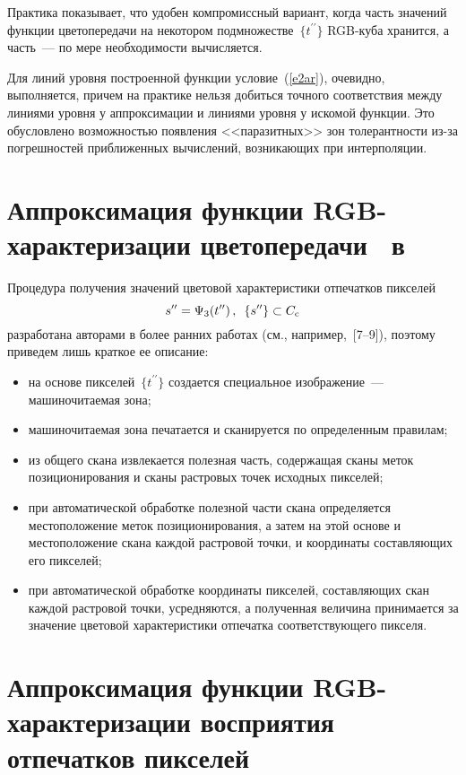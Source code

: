 \begin{multicols}{2}
  Практика показывает, что удобен компро\-мис\-сный вариант, когда часть 
значений функции цветопередачи на некотором 
подмножестве~$\{t^{\prime\prime}\}$ RGB-ку\-ба хранится, а часть~--- по 
мере необходимости вычисляется. 
  
  Для линий уровня построенной функции условие~(\ref{e2ar}), очевидно, 
выполняется, причем на практике нельзя добиться точного соответствия между 
линиями уровня у аппроксимации и линиями уровня у искомой функции. Это 
обусловлено возможностью появления <<паразитных>> зон толерантности 
  из-за погрешностей приближенных вычислений, возникающих при 
интерполяции. 

\section{Аппроксимация функции RGB-характеризации 
цветопередачи~
 в~ 
}

  Процедура получения значений цветовой характеристики отпечатков 
пикселей
  $$
s^{\prime\prime} = \Psi_3(t^{\prime\prime})\,,\enskip \{s^{\prime\prime}\} \subset 
C_{\mathrm{c}}
$$
разработана авторами в более ранних работах (см., например,~[7--9]), поэтому 
приведем лишь краткое ее описание:
\begin{itemize}
  \item на основе пикселей~$\{t^{\prime\prime}\}$ создается специальное 
изображение~--- машиночитаемая зона;
  \item машиночитаемая зона печатается и сканируется по определенным 
правилам;
  \item из общего скана извлекается полезная часть, содержащая сканы меток 
позиционирования и сканы растровых точек исходных пикселей;
  \item при автоматической обработке полезной части скана определяется 
местоположение меток позиционирования, а затем на этой основе и 
мес\-то\-по\-ло\-же\-ние скана каждой растровой точки, и координаты составляющих 
его пикселей;
  \item при автоматической обработке координаты пикселей, составляющих 
скан каждой растровой точки, усредняются, а полученная величина 
принимается за значение цветовой характеристики отпечатка 
соответствующего пикселя.
  \end{itemize}
  
\section{Аппроксимация функции RGB-характеризации 
восприятия отпечатков пикселей}
  

\end{multicols}
